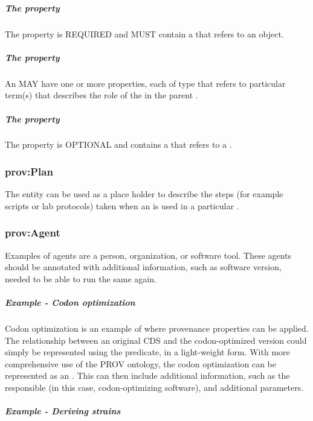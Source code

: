 \subparagraph{The  property}\label{sec:prov:agent}

The  property is REQUIRED and MUST contain a  that refers to an  object.

\subparagraph{The  property}\label{sec:prov:hadRole:A}

An  MAY have one or more  properties, each of type  that refers to particular term(s) that describes the role of the  in the parent . 

\subparagraph{The  property}\label{sec:prov:hadPlan}

The  property is OPTIONAL and contains a  that refers to a .

\subsubsection{prov:Plan}
\label{sec:prov:Plan}

 The  entity can be used as a place holder to describe the steps (for example scripts or lab protocols) taken when an  is used in a particular . 

\subsubsection{prov:Agent}
\label{sec:prov:Agent}

Examples of agents are a person, organization, or software tool. 
These agents should be annotated with additional information, such as software version, needed to be able to run the same  again.

\subparagraph{Example - Codon optimization}

Codon optimization is an example of where provenance properties can be applied. 
The relationship between an original CDS and the codon-optimized version could simply be represented using the  predicate, in a light-weight form. With more comprehensive use of the PROV ontology, the codon optimization can be represented as an . This  can then include additional information, such as the  responsible (in this case, codon-optimizing software), and additional parameters.

\subparagraph{Example - Deriving strains}

